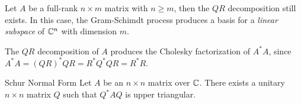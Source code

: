 \begin{rmk}
    Let $A$ be a full-rank $n \times m$ matrix with $n \geq m$, then the $QR$ decomposition still exists. In this case, the Gram-Schimdt process produces a basis for a \emph{linear subspace} of $\mathbb{C}^n$ with dimension $m$.
\end{rmk}

\begin{rmk}
    The $QR$ decomposition of $A$ produces the Cholesky factorization of $A^{*}A$, since $A^{*}A = (QR)^{*}QR = R^{*}Q^{*}QR = R^{*}R$.
\end{rmk}

\begin{thm}{Schur Normal Form}\proofbreak
    Let $A$ be an $n \times n$ matrix over $\mathbb{C}$. There exists a unitary $n \times n$ matrix $Q$ such that $Q^{*}AQ$ is upper triangular.
\end{thm}

